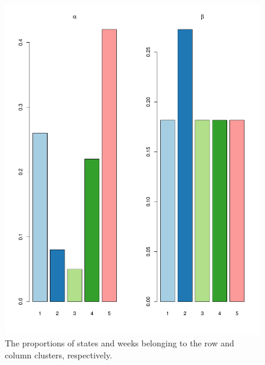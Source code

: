 \documentclass[12pt,a4paper]{article}
\begin{document}
\begin{figure}[H]
	\begin{center}
		\includegraphics[width=\columnwidth]{Cases_prop.pdf}
		\caption{The proportions of states and weeks belonging to the row and column clusters, respectively.}
		
	\end{center}
\end{figure}
%
%
\end{document}
